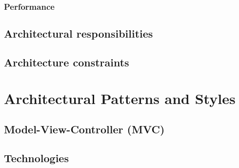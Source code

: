\documentclass[a4paper,12pt,titlepage]{article}
\begin{document}
		\subsubsection{Performance}
	\subsection{Architectural responsibilities}
	\subsection{Architecture constraints}	



\section{Architectural Patterns and Styles}
	\subsection{Model-View-Controller (MVC)}
	
	
	\subsection{Technologies}
	
	
	

\end{document}
